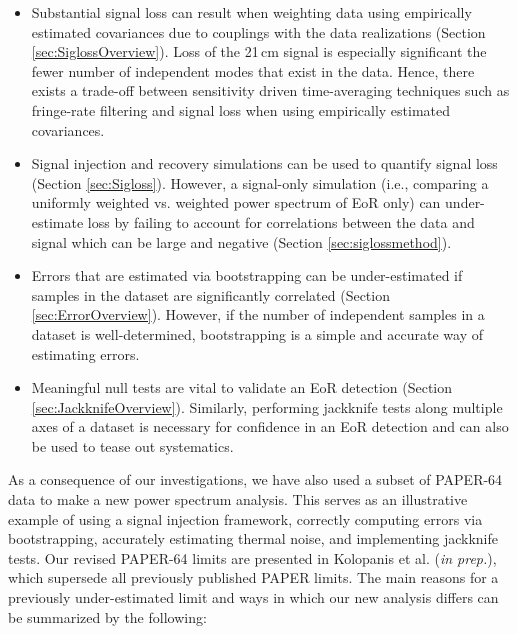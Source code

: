 \documentclass[preprint2,numberedappendix,tighten]{aastex6}  %
\begin{document}
\begin{itemize}
\item Substantial signal loss can result when weighting data using empirically estimated covariances due to couplings with the data realizations (Section 
\ref{sec:SiglossOverview}). Loss of the 21\,cm signal is especially significant the fewer number of independent modes that
exist in the data. Hence, there exists a trade-off between sensitivity driven 
time-averaging techniques such as fringe-rate filtering and signal loss when using empirically estimated covariances. 
\item Signal injection and recovery simulations can be used to quantify signal loss (Section \ref{sec:Sigloss}). However, a 
signal-only simulation (i.e., comparing a uniformly weighted vs. weighted power spectrum of EoR only) can under-estimate loss by 
failing to account for correlations between the data and signal which can be large and negative (Section \ref{sec:siglossmethod}).
\item Errors that are estimated via bootstrapping can be under-estimated if samples in the dataset are significantly correlated 
(Section \ref{sec:ErrorOverview}). However, if the number of independent samples in a dataset is well-determined, bootstrapping is a 
simple and accurate way of estimating errors.
\item Meaningful null tests are vital to validate an EoR detection (Section \ref{sec:JackknifeOverview}). Similarly, performing 
jackknife tests along multiple axes of a dataset is necessary for confidence in an EoR detection and can also be used to tease 
out systematics.
\end{itemize}

As a consequence of our investigations, we have also used a subset of PAPER-64 data to make a new power spectrum analysis. This serves as an illustrative example of using a signal injection framework, correctly computing errors via bootstrapping, accurately estimating thermal noise, and implementing jackknife tests. Our revised PAPER-64 limits are presented in Kolopanis et al. (\textit{in prep.}), which supersede all previously published PAPER limits. The main reasons for a previously under-estimated limit and 
ways in which our new analysis differs can be summarized by the following:
\end{document}
